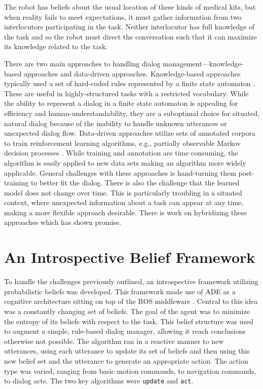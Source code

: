 \documentclass[12pt]{article}
\begin{document}
The robot has beliefs about the usual location of these kinds of
medical kits, but when reality fails to meet expectations, it must
gather information from two interlocutors participating in the
task. Neither interlocutor has full knowledge of the task and so the
robot must direct the conversation such that it can maximize its
knowledge related to the task.

There are two main approaches to handling dialog
management---knowledge-based approaches and data-driven approaches.
Knowledge-based approaches typically used a set of hard-coded rules
represented by a finite state automaton
\cite{Lee2010:dialog-management}. These are useful in
highly-structured tasks with a restricted vocabulary. While the
ability to represent a dialog in a finite state automaton is appealing
for efficiency and human-understandability, they are a suboptimal
choice for situated, natural dialog because of the inability to handle
unknown utterances or unexpected dialog flow. Data-driven approaches
utilize sets of annotated corpora to train reinforcement learning
algorithms, e.g., partially observable Markov decision processes
\cite{Young2013:dialog-pomdp}. While training and annotation are time
consuming, the algorithm is easily applied to new data sets making an
algorithm more widely applicable. General challenges with these
approaches is hand-turning them post-training to better fit the
dialog. There is also the challenge that the learned model does not
change over time. This is particularly troubling in a situated
context, where unexpected information about a task can appear at any
time, making a more flexible approach desirable. There is work on
hybridizing these approaches which has shown promise.

\section{An Introspective Belief Framework}
\label{sec:framework}
To handle the challenges previously outlined, an introspective
framework utilizing probabilistic beliefs was developed. This
framework made use of ADE \cite{Kramer2007} as a cognitive
architecture sitting on top of the ROS middleware \cite{Quigley2009}.
Central to this idea was a constantly changing set of beliefs. The
goal of the agent was to minimize the entropy of its beliefs with
respect to the task. This belief structure was used to augment a
simple, rule-based dialog manager, allowing it reach conclusions
otherwise not possible. The algorithm ran in a reactive manner to new
utterances, using each utterance to update its set of beliefs and then
using this new belief set and the utterance to generate an appropriate
action. The action type was varied, ranging from basic motion
commands, to navigation commands, to dialog acts. The two key
algorithms were \texttt{update} and \texttt{act}.
\end{document}
